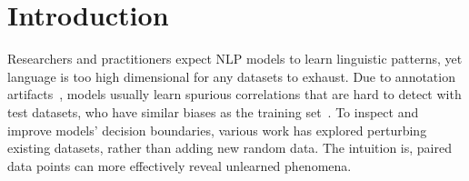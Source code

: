 \section{Introduction}
\label{sec:intro}

\begin{comment}
Motivation:
- Counterfactual is important. Used in many evaluation and model improvement approaches. Like mentioned in other papers, perturbations of inputs would allow us to highlight what really matters more efficiently than getting different examples
- Existing methods have limitations:
	○ Auto-method seems to focus on word substitution, or paraphrasing. More scalable, but usually too simplistic.
	○ More diverse counterfactuals rely on human effort. More diverse and natural, but hard to scale:
		§ Cannot create this for all instances
		§ For just one instance, just getting one perturbation (good -> bad) still ignores many other decision boundary dimensions (good -> not good)
	- Goal: To create a counterfactual generator that
		○ can automatically cover more patterns
		○ But still systematic enough for scaled analysis

Contribution bullets:
	- Survey on prior work, summarize applications + desired properties
	- Perturbation as a generation model, the design of perturbation type control and the importance of [BLANK]
	- Application - counterfactual explanation
		○ Design - categorize patterns to search for, grouping/ranking/summarization, interactive mode
		○ Validly - User study
		○ Finding - case study on some model
	- Application - labeling
		○ Ranking, grouped labeling
		○ Training data: get better results compared to
			§ Adding the same amount of training data
			§ asking people to generate counterfactuals using the same budget
		○ Evaluation data: further decrease the SOTA model performance
		○ Vision - not tested, but we think presenting some existing perturbations first should help people get more creative when they come up with their owns [future work…]

\end{comment}

Researchers and practitioners expect NLP models to learn linguistic patterns, yet language is too high dimensional for any datasets to exhaust.
Due to annotation artifacts~\cite{}, models usually learn spurious correlations that are hard to detect with test datasets, who have similar biases as the training set~\cite{rajpurkar-etal-2018-know}.
To inspect and improve models' decision boundaries, various work has explored perturbing existing datasets, rather than adding new random data.
The intuition is, paired data points can more effectively reveal unlearned phenomena. 


